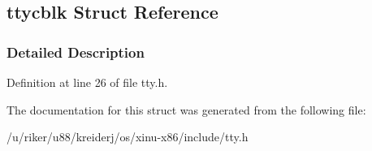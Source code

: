 \hypertarget{structttycblk}{}\subsection{ttycblk Struct Reference}
\label{structttycblk}


\subsubsection{Detailed Description}


Definition at line 26 of file tty.\+h.



The documentation for this struct was generated from the following file\+:\begin{DoxyCompactItemize}
\item 
/u/riker/u88/kreiderj/os/xinu-\/x86/include/tty.\+h\end{DoxyCompactItemize}
